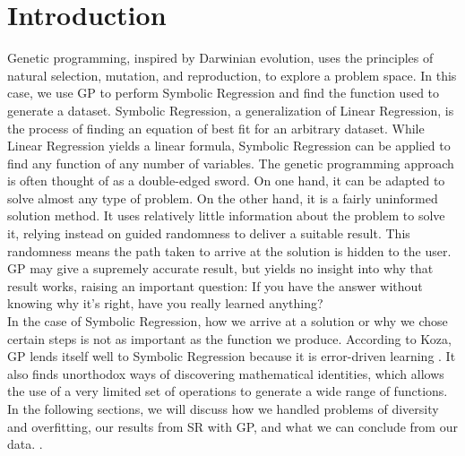 
\section{Introduction}
\label{sec:intro}

Genetic programming, inspired by Darwinian evolution, uses the principles of natural selection, mutation, and reproduction, to explore a problem space. In this case, we use GP to perform Symbolic Regression and find the function used to generate a dataset. Symbolic Regression, a generalization of Linear Regression, is the process of finding an equation of best fit for an arbitrary dataset. While Linear Regression yields a linear formula, Symbolic Regression can be applied to find any function of any number of variables. The genetic programming approach is often thought of as a double-edged sword. On one hand, it can be adapted to solve almost any type of problem. On the other hand, it is a fairly uninformed solution method. It uses relatively little information about the problem to solve it, relying instead on guided randomness to deliver a suitable result. This randomness means the path taken to arrive at the solution is hidden to the user. GP may give a supremely accurate result, but yields no insight into why that result works, raising an important question: If you have the answer without knowing why it's right, have you really learned anything? \\
In the case of Symbolic Regression, how we arrive at a solution or why we chose certain steps is not as important as the function we produce. According to Koza, GP lends itself well to Symbolic Regression because it is error-driven learning \cite{Koza97geneticprogramming}.  It also finds unorthodox ways of discovering mathematical identities, which allows the use of a very limited set of operations to generate a wide range of functions.
In the following sections, we will discuss how we handled problems of diversity and overfitting, our results from SR with GP, and what we can conclude from our data.
. \\



